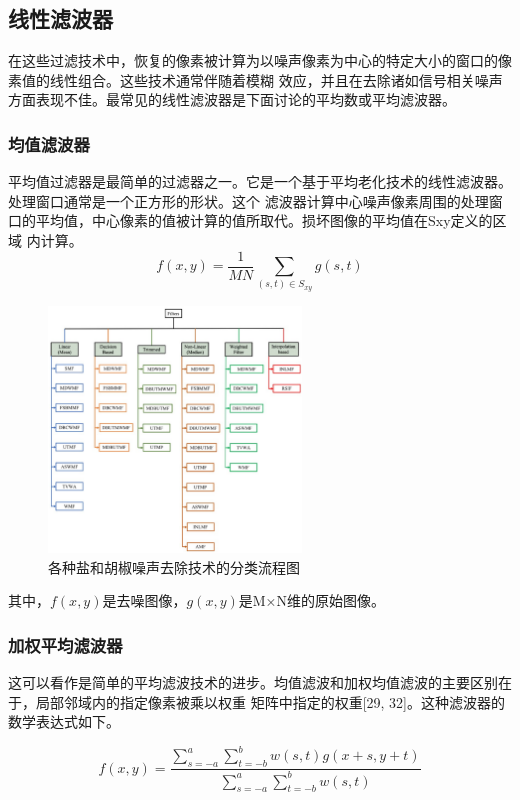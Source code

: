 \documentclass[12pt]{article} %
\begin{document}
\subsection{线性滤波器}
在这些过滤技术中，恢复的像素被计算为以噪声像素为中心的特定大小的窗口的像素值的线性组合。这些技术通常伴随着模糊
效应，并且在去除诸如信号相关噪声方面表现不佳。最常见的线性滤波器是下面讨论的平均数或平均滤波器。

\subsubsection{均值滤波器}
平均值过滤器是最简单的过滤器之一。它是一个基于平均老化技术的线性滤波器。处理窗口通常是一个正方形的形状。这个
滤波器计算中心噪声像素周围的处理窗口的平均值，中心像素的值被计算的值所取代。损坏图像的平均值在Sxy定义的区域
内计算\cite{ref1,ref5,ref6,ref24}。
\begin{equation}
    f(x,y)=\frac{1}{MN}\sum_{(s,t)\in S_{xy}}g(s,t)
\end{equation}
\begin{figure}[H]
    \centering
    \includegraphics[width=0.6\textwidth]{images/01.eps}
    \caption{各种盐和胡椒噪声去除技术的分类流程图}
    \label{fig:meanfilter}
\end{figure}
其中，$f(x,y)$是去噪图像，$g(x,y)$是M×N维的原始图像。

\subsubsection{加权平均滤波器}
这可以看作是简单的平均滤波技术的进步。均值滤波和加权均值滤波的主要区别在于，局部邻域内的指定像素被乘以权重
矩阵中指定的权重[29, 32]。这种滤波器的数学表达式如下。

\begin{equation}
    f(x, y)=\frac{\sum_{s=-a}^a \sum_{t=-b}^b w(s, t) g(x+s, y+t)}{\sum_{s=-a}^a \sum_{t=-b}^b w(s, t)}
\end{equation}
\end{document}
